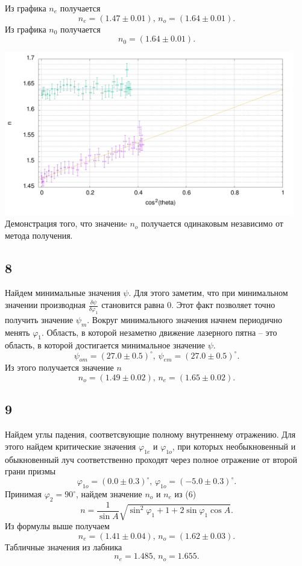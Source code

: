 Из графика $n_e$ получается
\[n_e = (1.47\pm0.01),\,n_o = (1.64\pm0.01).\]
Из графика $n_0$ получается
\[n_0 = (1.64\pm0.01).\]

\begin{center}
\includegraphics[width=0.95\textwidth]{down_up_1.png}
Демонстрация того, что значениe $n_o$ получается одинаковым независимо от метода получения.
\end{center}

\subsection{8}
Найдем минимальные значения $\psi$. Для этого заметим, что при минимальном значении производная $\frac{\delta \psi}{\delta \varphi_1}$ становится равна $0$. Этот факт позволяет точно получить значение $\psi_m$. Вокруг минимального значения начнем периодично менять $\varphi_1$. Область, в которой незаметно движение лазерного пятна -- это область, в которой достигается минимальное значение $\psi$.
\[\psi_{om} = (27.0\pm0.5)^\circ,\,\psi_{em} = (27.0\pm0.5)^\circ.\]
Из этого получается значение $n$
\[n_o = (1.49\pm0.02),\,n_e = (1.65\pm0.02).\]
\subsection{9}
Найдем углы падения, соответсвующие полному внутреннему отражению. Для этого найдем критические значения $\varphi_{1e}$ и $\varphi_{1o}$, при которых необыкновенный и обыкновенный луч соответственно проходят через полное отражение от второй грани призмы
\[\varphi_{1o} = (0.0\pm0.3)^\circ,\,\varphi_{1o} = (-5.0\pm0.3)^\circ.\]
Принимая $\varphi_2=90^\circ$, найдем значение $n_o$ и $n_e$ из (6)
\[n = \frac{1}{\sin A}\sqrt{\sin^2\varphi_1 + 1 + 2 \sin\varphi_1\cos A}.\]
Из формулы выше получаем
\[n_e = (1.41\pm0.04),\,n_o = (1.62\pm0.03).\]
Табличные значения из лабника
\[n_e = 1.485,\,n_o = 1.655.\]

